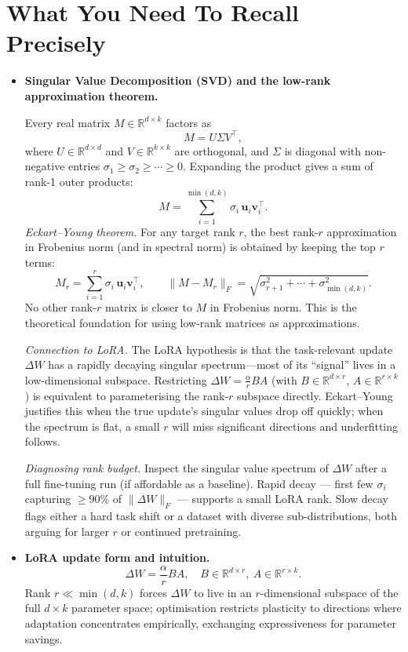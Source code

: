 \section*{What You Need To Recall Precisely}
\begin{itemize}[leftmargin=1.5em]
  \item \textbf{Singular Value Decomposition (SVD) and the low-rank approximation theorem.}

  Every real matrix $M \in \mathbb{R}^{d \times k}$ factors as
  \[
    M = U\Sigma V^\top,
  \]
  where $U \in \mathbb{R}^{d\times d}$ and $V \in \mathbb{R}^{k\times k}$ are orthogonal, and $\Sigma$ is diagonal with non-negative entries $\sigma_1 \ge \sigma_2 \ge \cdots \ge 0$. Expanding the product gives a sum of rank-1 outer products:
  \[
    M = \sum_{i=1}^{\min(d,k)} \sigma_i\, \mathbf{u}_i \mathbf{v}_i^\top.
  \]
  \emph{Eckart--Young theorem.} For any target rank $r$, the best rank-$r$ approximation in Frobenius norm (and in spectral norm) is obtained by keeping the top $r$ terms:
  \[
    M_r = \sum_{i=1}^{r} \sigma_i\, \mathbf{u}_i \mathbf{v}_i^\top,
    \qquad
    \|M - M_r\|_F = \sqrt{\sigma_{r+1}^2 + \cdots + \sigma_{\min(d,k)}^2}.
  \]
  No other rank-$r$ matrix is closer to $M$ in Frobenius norm. This is the theoretical foundation for using low-rank matrices as approximations.

  \emph{Connection to LoRA.} The LoRA hypothesis is that the task-relevant update $\Delta W$ has a rapidly decaying singular spectrum---most of its ``signal'' lives in a low-dimensional subspace. Restricting $\Delta W = \frac{\alpha}{r}BA$ (with $B \in \mathbb{R}^{d\times r}$, $A \in \mathbb{R}^{r\times k}$) is equivalent to parameterising the rank-$r$ subspace directly. Eckart--Young justifies this when the true update's singular values drop off quickly; when the spectrum is flat, a small $r$ will miss significant directions and underfitting follows.

  \emph{Diagnosing rank budget.} Inspect the singular value spectrum of $\Delta W$ after a full fine-tuning run (if affordable as a baseline). Rapid decay --- first few $\sigma_i$ capturing $\ge 90\%$ of $\|{\Delta W}\|_F$ --- supports a small LoRA rank. Slow decay flags either a hard task shift or a dataset with diverse sub-distributions, both arguing for larger $r$ or continued pretraining.

  \item \textbf{LoRA update form and intuition.}
  \[
    \Delta W = \frac{\alpha}{r}BA,\quad B\in\mathbb{R}^{d\times r},\ A\in\mathbb{R}^{r\times k}.
  \]
  Rank \(r\ll \min(d,k)\) forces \(\Delta W\) to live in an \(r\)-dimensional subspace of the full \(d\times k\) parameter space; optimisation restricts plasticity to directions where adaptation concentrates empirically, exchanging expressiveness for parameter savings.


\end{itemize}
